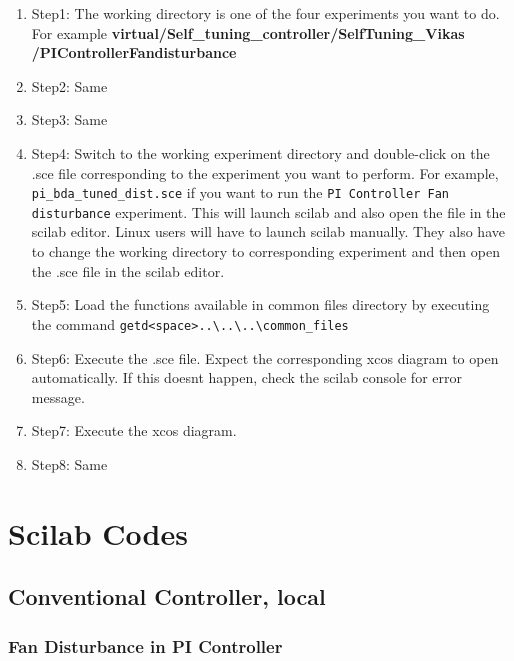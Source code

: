 \begin{enumerate}
\item Step1:  The working directory is one of the four experiments you want to do. For example {\bf virtual/Self\_tuning\_controller/SelfTuning\_Vikas\\/PIControllerFandisturbance}
\item Step2: Same
\item Step3: Same
\item Step4:  Switch to the working experiment directory and double-click on the .sce file corresponding to the experiment you want to perform.  For example, {\tt pi\_bda\_tuned\_dist.sce} if you want to run the {\tt PI Controller Fan disturbance} experiment. This will launch scilab and also open the file in the scilab editor. Linux users will have to launch scilab manually. They also have to change the working directory to corresponding experiment and then open the .sce file in the scilab editor.
\item Step5:  Load the functions available in common files directory by executing the command {\tt getd<space>..\textbackslash ..\textbackslash ..\textbackslash common\_files\ }
\item Step6: Execute the .sce file.  Expect the corresponding xcos diagram to open automatically. If this doesnt happen, check the scilab console for error message.
\item Step7: Execute the xcos diagram.
\item Step8: Same
\end{enumerate}



\section{Scilab Codes}
\begin{code}

\end{code}


\subsection{Conventional Controller, local}\label{convcode_local}
\subsubsection{Fan Disturbance in PI Controller}
\begin{code}

\end{code}


